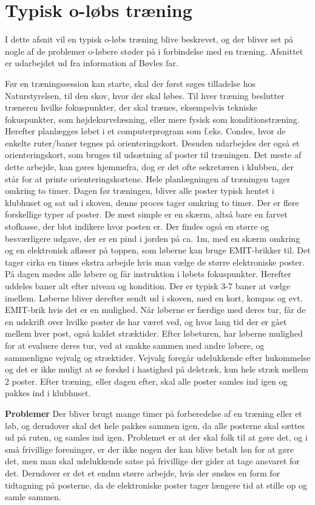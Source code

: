 \chapter{Typisk o-løbs træning}
I dette afsnit vil en typisk o-løbs træning blive beskrevet, og der bliver set på nogle af de problemer o-løbere støder på i forbindelse med en træning. Afsnittet er udarbejdet ud fra information af Bøvles far. 

Før en træningssession kan starte, skal der først søges tilladelse hos Naturstyrelsen, til den skov, hvor der skal løbes. 
Til hver træning beslutter træneren hvilke fokuspunkter, der skal trænes, eksempelvis tekniske fokuspunkter, som højdekurvelæsning, eller mere fysisk som konditionstræning. Herefter planlægges løbet i et computerprogram som f.eks. Condes, hvor de enkelte ruter/baner tegnes på orienteringskort. Desuden udarbejdes der også et orienteringskort, som bruges til udsætning af poster til træningen. Det meste af dette arbejde, kan gøres hjemmefra, dog er det ofte sekretæren i klubben, der står for at printe orienteringskortene. Hele planlægningen af træningen tager omkring to timer. Dagen før træningen, bliver alle poster typisk hentet i klubhuset og sat ud i skoven, denne proces tager omkring to timer. Der er flere forskellige typer af poster. De mest simple er en skærm, altså bare en farvet stofkasse, der blot indikere hvor posten er. Der findes også en større og besværligere udgave, der er en pind i jorden på ca. 1m, med en skærm omkring og en elektronisk aflæser på toppen, som løberne kan bruge EMIT-brikker til. Det tager cirka en times ekstra arbejde hvis man vælge de større elektroniske poster.
På dagen mødes alle løbere og får instruktion i løbets fokuspunkter. Herefter uddeles baner alt efter niveau og kondition. Der er typisk 3-7 baner at vælge imellem. Løberne bliver derefter sendt ud i skoven, med en kort, kompas og evt. EMIT-brik hvis det er en mulighed. Når løberne er færdige med deres tur, får de en udskrift over hvilke poster de har været ved, og hvor lang tid der er gået mellem hver post, også kaldet stræktider.
Efter løbeturen, har løberne mulighed for at evaluere deres tur, ved at snakke sammen med andre løbere, og sammenligne vejvalg og stræktider. Vejvalg foregår udelukkende efter hukommelse og det er ikke muligt at se forskel i hastighed på delstræk, kun hele stræk mellem 2 poster. 
Efter træning, eller dagen efter, skal alle poster samles ind igen og pakkes ind i klubhuset.


\textbf{Problemer}
Der bliver brugt mange timer på forberedelse af en træning eller et løb, og derudover skal det hele pakkes sammen igen, da alle posterne skal sættes ud på ruten, og samles ind igen. \newline
Problemet er at der skal folk til at gøre det, og i små frivillige foreninger, er der ikke nogen der kan blive betalt løn for at gøre det, men man skal udelukkende satse på frivillige der gider at tage ansvaret for det. \newline
Derudover er det et endnu større arbejde, hvis der ønskes en form for tidtagning på posterne, da de elektroniske poster tager længere tid at stille op og samle sammen. \newline

